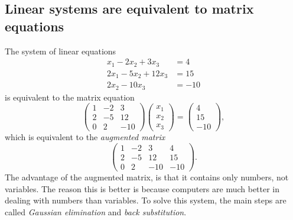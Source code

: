 
\subsection*{Linear systems are equivalent to matrix equations}
\label{lec:LSME}

The system of linear equations
\begin{equation*}
\begin{split}
     x_1 - 2 x_2 + 3 x_3 & = 4 \\
     2 x_1 - 5x_2 + 12 x_3 & = 15 \\
           2 x_2 -  10 x_3 & = -10 
\end{split}
\end{equation*}
is equivalent to the matrix equation
$$
\left(\begin{array}{ccc}
        1 & -2 & 3  \\
        2 & -5 & 12 \\
        0 & 2 & -10
      \end{array}\right)
\left(\begin{array}{c}
       x_1 \\ x_2 \\ x_3
      \end{array} \right)
=
\left(\begin{array}{c}
       4\\ 15 \\ -10
      \end{array} \right),
$$
which is equivalent to the {\em augmented matrix}
$$
\left(\begin{array}{ccc|c}
        1 & -2 & 3 & 4 \\
        2 & -5 & 12 & 15 \\
        0 & 2 & -10 & -10
      \end{array}\right).
$$
The advantage of the augmented matrix, is that it contains only
numbers, not variables. The reason this is better is because computers
are much better in dealing with numbers than variables. To solve
this system, the main steps are called {\em Gaussian elimination} and
{\em back substitution}.

